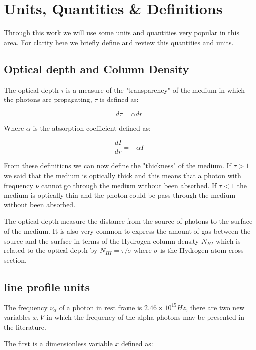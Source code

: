\section{Units, Quantities \& Definitions}

Through this work we will use some units and quantities very popular in 
this area. For clarity here we briefly define and review this 
quantities and units.

\subsection{Optical depth and Column Density}

The optical depth $\tau$ is a measure of the "transparency" of the medium
in which the photons are propagating, $\tau$ is defined as:

\begin{equation}
d\tau = \alpha dr
\end{equation}

Where $\alpha$ is the absorption coefficient defined as:

\begin{equation}
\dfrac{dI}{dr} = -\alpha I
\end{equation}

From these definitions we can now define the "thickness" of the medium.
If $\tau > 1$ we said that the medium is optically thick and this means
that a photon with frequency $\nu$ cannot go through the medium without been
absorbed. If $\tau < 1$ the medium is optically thin and the photon
could be pass through the medium without been absorbed.

The optical depth measure the distance from the source
of photons to the surface of the medium. It is also very common 
to express the amount of gas between the \ly source and the surface
in terms of the Hydrogen column density 
$N_{HI}$ which is related to the optical depth by $N_{HI} = \tau/\sigma$
where $\sigma$ is the Hydrogen atom cross section. 

\subsection{\ly line profile units}

The frequency $\nu_{\alpha}$ of a \ly photon in rest frame is
$2.46\times 10^{15}Hz$,
there are two new variables $x, V$ in which the frequency of 
the \ly alpha photons may be presented in the literature.

The first is a dimensionless variable $x$ defined as:

